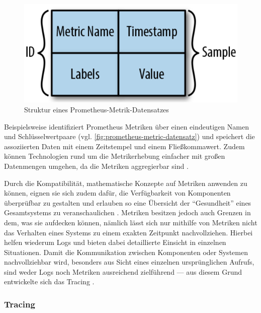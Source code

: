 \begin{figure}
\centering
\includegraphics[width=\linewidth]{img/03_methoden/prometheus-metric-sample.png}
\caption{Struktur eines Prometheus-Metrik-Datensatzes \cite{DistributedSystemsObservability}}
\label{fig:prometheus-metric-datensatz}
\end{figure}

Beispielsweise identifiziert Prometheus \cite{Prometheus} Metriken über einen eindeutigen Namen und Schlüsselwertpaare (vgl. \autoref{fig:prometheus-metric-datensatz}) und speichert die assoziierten Daten mit einem Zeitstempel und einem Fließkommawert. Zudem können Technologien rund um die Metrikerhebung einfacher mit großen Datenmengen umgehen, da die Metriken aggregierbar sind \cite{DistributedSystemsObservability}.

Durch die Kompatibilität, mathematische Konzepte auf Metriken anwenden zu können, eignen sie sich zudem dafür, die Verfügbarkeit von Komponenten überprüfbar zu gestalten und erlauben so eine Übersicht der \enquote{Gesundheit} eines Gesamtsystems zu veranschaulichen \cite{MultilevelObservabilityInCloudOrchestration} \cite{DistributedSystemsObservability}. Metriken besitzen jedoch auch Grenzen in dem, was sie aufdecken können, nämlich lässt sich nur mithilfe von Metriken nicht das Verhalten eines Systems zu einem exakten Zeitpunkt nachvollziehen. Hierbei helfen wiederum Logs und bieten dabei detaillierte Einsicht in einzelnen Situationen. Damit die Kommunikation zwischen Komponenten oder Systemen nachvollziehbar wird, besonders aus Sicht eines einzelnen ursprünglichen Aufrufs, sind weder Logs noch Metriken ausreichend zielführend --- aus diesem Grund entwickelte sich das Tracing \cite{MultilevelObservabilityInCloudOrchestration} \cite{DistributedSystemsObservability}.

\subsubsection{Tracing}
\label{sec:tracing}

